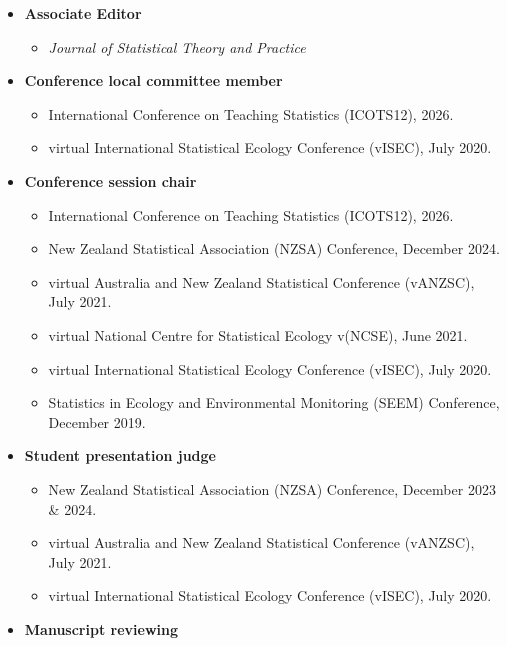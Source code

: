 \documentclass[10pt,a4paper]{moderncv}
\begin{document}
\begin{itemize}
\item \textbf{Associate Editor}
  \begin{itemize}
  \item \textit{Journal of Statistical Theory and Practice}
  \end{itemize}
  \item \textbf{Conference local committee member}
    \begin{itemize}
     \item International Conference on Teaching Statistics (ICOTS12), 2026.
     \item virtual International Statistical Ecology Conference (vISEC), July 2020.
  \end{itemize}
\item \textbf{Conference session chair}
  \begin{itemize}
  \item International Conference on Teaching Statistics (ICOTS12), 2026.
    \item New Zealand Statistical Association (NZSA) Conference, December 2024.
  \item virtual Australia and New Zealand Statistical Conference (vANZSC), July 2021.
  \item virtual National Centre for Statistical Ecology v(NCSE), June 2021.
  \item virtual International Statistical Ecology Conference (vISEC), July 2020.
  \item Statistics in Ecology and Environmental Monitoring (SEEM) Conference, December 2019.
  \end{itemize}
\item \textbf{Student presentation judge}
  \begin{itemize}
    \item New Zealand Statistical Association (NZSA) Conference, December 2023 \& 2024.
  \item virtual Australia and New Zealand Statistical Conference (vANZSC), July 2021.
  \item virtual International Statistical Ecology Conference (vISEC), July 2020.
  \end{itemize}
\item \textbf{Manuscript reviewing}

\end{itemize}
\end{document}

